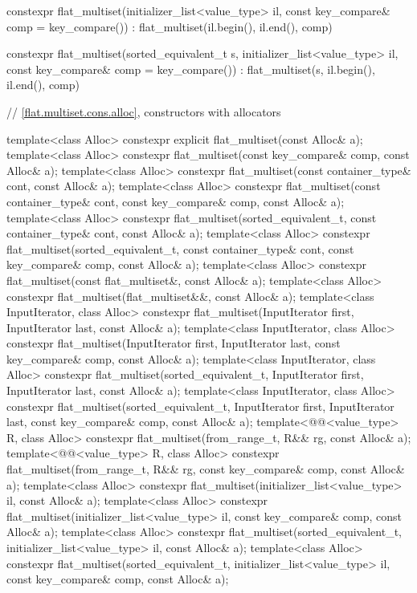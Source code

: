\begin{codeblock}
{{    constexpr flat_multiset(initializer_list<value_type> il,
                            const key_compare& comp = key_compare())
      : flat_multiset(il.begin(), il.end(), comp) { }

    constexpr flat_multiset(sorted_equivalent_t s, initializer_list<value_type> il,
                            const key_compare& comp = key_compare())
        : flat_multiset(s, il.begin(), il.end(), comp) { }

    // \ref{flat.multiset.cons.alloc}, constructors with allocators

    template<class Alloc>
      constexpr explicit flat_multiset(const Alloc& a);
    template<class Alloc>
      constexpr flat_multiset(const key_compare& comp, const Alloc& a);
    template<class Alloc>
      constexpr flat_multiset(const container_type& cont, const Alloc& a);
    template<class Alloc>
      constexpr flat_multiset(const container_type& cont, const key_compare& comp,
                              const Alloc& a);
    template<class Alloc>
      constexpr flat_multiset(sorted_equivalent_t, const container_type& cont, const Alloc& a);
    template<class Alloc>
      constexpr flat_multiset(sorted_equivalent_t, const container_type& cont,
                              const key_compare& comp, const Alloc& a);
    template<class Alloc>
      constexpr flat_multiset(const flat_multiset&, const Alloc& a);
    template<class Alloc>
      constexpr flat_multiset(flat_multiset&&, const Alloc& a);
    template<class InputIterator, class Alloc>
      constexpr flat_multiset(InputIterator first, InputIterator last, const Alloc& a);
    template<class InputIterator, class Alloc>
      constexpr flat_multiset(InputIterator first, InputIterator last,
                              const key_compare& comp, const Alloc& a);
    template<class InputIterator, class Alloc>
      constexpr flat_multiset(sorted_equivalent_t, InputIterator first, InputIterator last,
                              const Alloc& a);
    template<class InputIterator, class Alloc>
      constexpr flat_multiset(sorted_equivalent_t, InputIterator first, InputIterator last,
                              const key_compare& comp, const Alloc& a);
    template<@@<value_type> R, class Alloc>
      constexpr flat_multiset(from_range_t, R&& rg, const Alloc& a);
    template<@@<value_type> R, class Alloc>
      constexpr flat_multiset(from_range_t, R&& rg, const key_compare& comp, const Alloc& a);
    template<class Alloc>
      constexpr flat_multiset(initializer_list<value_type> il, const Alloc& a);
    template<class Alloc>
      constexpr flat_multiset(initializer_list<value_type> il, const key_compare& comp,
                              const Alloc& a);
    template<class Alloc>
      constexpr flat_multiset(sorted_equivalent_t, initializer_list<value_type> il,
                              const Alloc& a);
    template<class Alloc>
      constexpr flat_multiset(sorted_equivalent_t, initializer_list<value_type> il,
                              const key_compare& comp, const Alloc& a);

}}
\end{codeblock}
